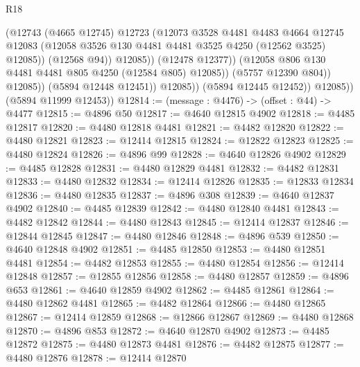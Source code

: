 \begin{lexlean}{R18}
\begin{coremodule}
                                (@12743
                                  (@4665 @12745)
                                  @12723
                                  (@12073
                                    @3528
                                    @4481
                                    @4483
                                    @4664
                                    @12745
                                    @12083
                                    (@12058
                                      @3526
                                      @130
                                      @4481
                                      @4481
                                      @3525
                                      @4250
                                      (@12562 @3525)
                                      @12085))
                                  (@12568 @94))
                                @12085))
                            (@12478 @12377))
                          (@12058 @806 @130 @4481 @4481 @805 @4250 (@12584 @805) @12085))
                        (@5757 @12390 @804))
                      @12085))
                  (@5894 @12448 @12451))
                @12085))
            (@5894 @12445 @12452))
          @12085))
      (@5894 @11999 @12453))
@12814 := (message : @4476) -> (offset : @44) -> @4477
@12815 := @4896 @50
@12817 := @4640 @12815 @4902
@12818 := @4485 @12817
@12820 := @4480 @12818 @4481
@12821 := @4482 @12820
@12822 := @4480 @12821
@12823 := @12414 @12815
@12824 := @12822 @12823
@12825 := @4480 @12824
@12826 := @4896 @99
@12828 := @4640 @12826 @4902
@12829 := @4485 @12828
@12831 := @4480 @12829 @4481
@12832 := @4482 @12831
@12833 := @4480 @12832
@12834 := @12414 @12826
@12835 := @12833 @12834
@12836 := @4480 @12835
@12837 := @4896 @308
@12839 := @4640 @12837 @4902
@12840 := @4485 @12839
@12842 := @4480 @12840 @4481
@12843 := @4482 @12842
@12844 := @4480 @12843
@12845 := @12414 @12837
@12846 := @12844 @12845
@12847 := @4480 @12846
@12848 := @4896 @539
@12850 := @4640 @12848 @4902
@12851 := @4485 @12850
@12853 := @4480 @12851 @4481
@12854 := @4482 @12853
@12855 := @4480 @12854
@12856 := @12414 @12848
@12857 := @12855 @12856
@12858 := @4480 @12857
@12859 := @4896 @653
@12861 := @4640 @12859 @4902
@12862 := @4485 @12861
@12864 := @4480 @12862 @4481
@12865 := @4482 @12864
@12866 := @4480 @12865
@12867 := @12414 @12859
@12868 := @12866 @12867
@12869 := @4480 @12868
@12870 := @4896 @853
@12872 := @4640 @12870 @4902
@12873 := @4485 @12872
@12875 := @4480 @12873 @4481
@12876 := @4482 @12875
@12877 := @4480 @12876
@12878 := @12414 @12870

\end{coremodule}
\end{lexlean}
